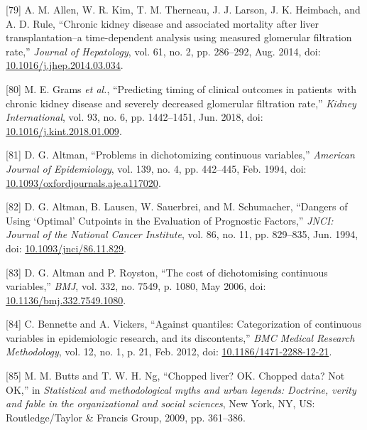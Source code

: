 \documentclass[12pt,PhD,twoside,openright]{muthesis}
\newenvironment{cslreferences}%
  {}%
  {\par}
\begin{document}
\begin{cslreferences}
\leavevmode\hypertarget{ref-allen_chronic_2014}{}%
{[}79{]} A. M. Allen, W. R. Kim, T. M. Therneau, J. J. Larson, J. K. Heimbach, and A. D. Rule, ``Chronic kidney disease and associated mortality after liver transplantation--a time-dependent analysis using measured glomerular filtration rate,'' \emph{Journal of Hepatology}, vol. 61, no. 2, pp. 286--292, Aug. 2014, doi: \href{https://doi.org/10.1016/j.jhep.2014.03.034}{10.1016/j.jhep.2014.03.034}.

\leavevmode\hypertarget{ref-grams_predicting_2018}{}%
{[}80{]} M. E. Grams \emph{et al.}, ``Predicting timing of clinical outcomes in patients~with chronic kidney disease and severely decreased glomerular filtration rate,'' \emph{Kidney International}, vol. 93, no. 6, pp. 1442--1451, Jun. 2018, doi: \href{https://doi.org/10.1016/j.kint.2018.01.009}{10.1016/j.kint.2018.01.009}.

\leavevmode\hypertarget{ref-altman_problems_1994-1}{}%
{[}81{]} D. G. Altman, ``Problems in dichotomizing continuous variables,'' \emph{American Journal of Epidemiology}, vol. 139, no. 4, pp. 442--445, Feb. 1994, doi: \href{https://doi.org/10.1093/oxfordjournals.aje.a117020}{10.1093/oxfordjournals.aje.a117020}.

\leavevmode\hypertarget{ref-altman_dangers_1994-1}{}%
{[}82{]} D. G. Altman, B. Lausen, W. Sauerbrei, and M. Schumacher, ``Dangers of Using `Optimal' Cutpoints in the Evaluation of Prognostic Factors,'' \emph{JNCI: Journal of the National Cancer Institute}, vol. 86, no. 11, pp. 829--835, Jun. 1994, doi: \href{https://doi.org/10.1093/jnci/86.11.829}{10.1093/jnci/86.11.829}.

\leavevmode\hypertarget{ref-altman_cost_2006-1}{}%
{[}83{]} D. G. Altman and P. Royston, ``The cost of dichotomising continuous variables,'' \emph{BMJ}, vol. 332, no. 7549, p. 1080, May 2006, doi: \href{https://doi.org/10.1136/bmj.332.7549.1080}{10.1136/bmj.332.7549.1080}.

\leavevmode\hypertarget{ref-bennette_against_2012-1}{}%
{[}84{]} C. Bennette and A. Vickers, ``Against quantiles: Categorization of continuous variables in epidemiologic research, and its discontents,'' \emph{BMC Medical Research Methodology}, vol. 12, no. 1, p. 21, Feb. 2012, doi: \href{https://doi.org/10.1186/1471-2288-12-21}{10.1186/1471-2288-12-21}.

\leavevmode\hypertarget{ref-butts_chopped_2009-1}{}%
{[}85{]} M. M. Butts and T. W. H. Ng, ``Chopped liver? OK. Chopped data? Not OK,'' in \emph{Statistical and methodological myths and urban legends: Doctrine, verity and fable in the organizational and social sciences}, New York, NY, US: Routledge/Taylor \& Francis Group, 2009, pp. 361--386.


\end{cslreferences}
\end{document}
